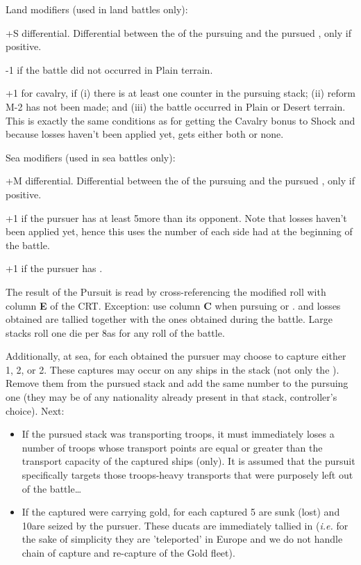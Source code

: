 Land modifiers (used in land battles only):
\begin{modlist}
\item[+S] \Shock differential. Differential between the \Shock of the pursuing
  \LeaderG and the pursued \LeaderG, only if positive.
\item[-1] if the battle did not occurred in Plain terrain.
\item[+1] for \TUR {} cavalry, if (i) there is at least one \TUR
  \ARMY counter in the pursuing stack; (ii) reform M-2 has not been made; and
  (iii) the battle occurred in Plain or Desert terrain. This is exactly the
  same conditions as for getting the Cavalry bonus to Shock and because losses
  haven't been applied yet, \TUR gets either both or none.
\end{modlist}

Sea modifiers (used in sea battles only):
\begin{modlist}
\item[+M] \Man differential. Differential between the \Man of the pursuing
  \LeaderA and the pursued \LeaderA, only if positive.
\item[+1] if the pursuer has at least 5\ND more than its opponent. Note that
  losses haven't been applied yet, hence this uses the number of \ND each side
  had at the beginning of the battle.
\item[+1] if the pursuer has .
\end{modlist}

The result of the Pursuit is read by cross-referencing the modified roll with
column \textbf{E} of the CRT. Exception: use column \textbf{C} when pursuing
\NTD or \NGD. \textetoile and losses obtained are tallied together with the
ones obtained during the battle. Large  stacks roll one die per
8\LD as for any roll of the battle.

Additionally, at sea, for each \textetoile obtained the pursuer may choose to
capture either 1\NWD, 2\NGD, or 2\NTD. These captures may occur on any ships
in the stack (not only the ). Remove them from the
pursued stack and add the same number to the pursuing one (they may be of any
nationality already present in that stack, controller's choice). Next:
\begin{itemize}
\item If the pursued stack was transporting troops, it must immediately loses
  a number of troops whose transport points are equal or greater than the
  transport capacity of the captured ships (only). It is assumed that the
  pursuit specifically targets those troops-heavy transports that were
  purposely left out of the battle\ldots
\item If the \NTD captured were carrying gold, for each \NTD captured 5\ducats
  are sunk (lost) and 10\ducats are seized by the pursuer. These ducats are
  immediately tallied in 
  (\emph{i.e.} for the sake of simplicity they are 'teleported' in Europe and
  we do not handle chain of capture and re-capture of the Gold fleet).
\end{itemize}

